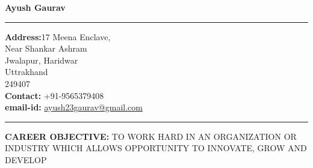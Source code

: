 \documentclass[10pt]{article}
\begin{document}
	\large
	{\Huge\noindent\hspace*{200pt}\textbf{Ayush Gaurav}}
	\vspace{.5cm}
	\hrule
	\begin{minipage}{0.4\textwidth}
		\begin{flushleft}
			\textbf{Address:}17 Meena Enclave,\\
			Near Shankar Ashram\\
			Jwalapur, Haridwar\\
			Uttrakhand\\
			249407 \\
			\textbf{Contact:} +91-9565379408\\
			\textbf{email-id:} \href{mailto:ayush23gaurav@gmail.com}{ayush23gaurav@gmail.com}
		\end{flushleft}
	\end{minipage}
	\hfill
	\begin{minipage}{0.4\textwidth}
		\begin{flushright}
		\end{flushright}
	\end{minipage}
	\hrule
	\vspace{0.5cm}
		\par{\Large\noindent\textbf{CAREER OBJECTIVE:}} 
	TO WORK HARD IN AN ORGANIZATION OR INDUSTRY WHICH ALLOWS OPPORTUNITY TO INNOVATE, GROW AND DEVELOP
	
\end{document}
